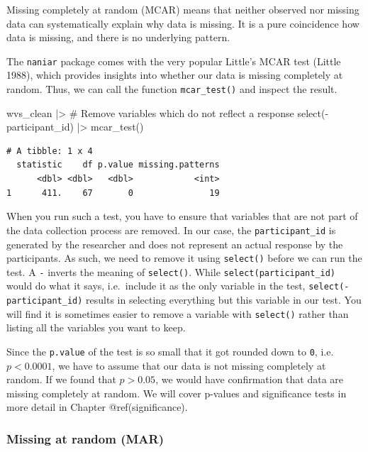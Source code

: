 \documentclass[
  letterpaper,
]{krantz}
\makeatletter
\newenvironment{Shaded}{\begin{snugshade}}{\end{snugshade}}
\newcommand{\CommentTok}[1]{\textcolor[rgb]{0.37,0.37,0.37}{#1}}
\newcommand{\FunctionTok}[1]{\textcolor[rgb]{0.28,0.35,0.67}{#1}}
\newcommand{\NormalTok}[1]{\textcolor[rgb]{0.00,0.23,0.31}{#1}}
\newcommand{\SpecialCharTok}[1]{\textcolor[rgb]{0.37,0.37,0.37}{#1}}
\newenvironment{kframe}{%
\medskip{}
\setlength{\fboxsep}{.8em}
 \def\at@end@of@kframe{}%
 \ifinner\ifhmode%
  \def\at@end@of@kframe{\end{minipage}}%
  \begin{minipage}{\columnwidth}%
 \fi\fi%
 \def\FrameCommand##1{\hskip\@totalleftmargin \hskip-\fboxsep
 \colorbox{shadecolor}{##1}\hskip-\fboxsep
     \hskip-\linewidth \hskip-\@totalleftmargin \hskip\columnwidth}%
 \MakeFramed {\advance\hsize-\width
   \@totalleftmargin\z@ \linewidth\hsize
   \@setminipage}}%
 {\par\unskip\endMakeFramed%
 \at@end@of@kframe}
\renewenvironment{Shaded}{\begin{kframe}}{\end{kframe}}
\makeatother
\begin{document}
Missing completely at random (MCAR) means that neither observed nor
missing data can systematically explain why data is missing. It is a
pure coincidence how data is missing, and there is no underlying
pattern.

The \texttt{naniar} package comes with the very popular Little's MCAR
test (Little 1988), which provides insights into whether our data is
missing completely at random. Thus, we can call the function
\texttt{mcar\_test()} and inspect the result.

\begin{Shaded}
\begin{Highlighting}[]
\NormalTok{wvs\_clean }\SpecialCharTok{|\textgreater{}}
  \CommentTok{\# Remove variables which do not reflect a response}
  \FunctionTok{select}\NormalTok{(}\SpecialCharTok{{-}}\NormalTok{participant\_id) }\SpecialCharTok{|\textgreater{}}
  \FunctionTok{mcar\_test}\NormalTok{()}
\end{Highlighting}
\end{Shaded}

\begin{verbatim}
# A tibble: 1 x 4
  statistic    df p.value missing.patterns
      <dbl> <dbl>   <dbl>            <int>
1      411.    67       0               19
\end{verbatim}

When you run such a test, you have to ensure that variables that are not
part of the data collection process are removed. In our case, the
\texttt{participant\_id} is generated by the researcher and does not
represent an actual response by the participants. As such, we need to
remove it using \texttt{select()} before we can run the test. A
\texttt{-} inverts the meaning of \texttt{select()}. While
\texttt{select(participant\_id)} would do what it says, i.e.~include it
as the only variable in the test, \texttt{select(-participant\_id)}
results in selecting everything but this variable in our test. You will
find it is sometimes easier to remove a variable with \texttt{select()}
rather than listing all the variables you want to keep.

Since the \texttt{p.value} of the test is so small that it got rounded
down to \texttt{0}, i.e.~\(p<0.0001\), we have to assume that our data
is not missing completely at random. If we found that \(p>0.05\), we
would have confirmation that data are missing completely at random. We
will cover p-values and significance tests in more detail in Chapter
@ref(significance).

\subsubsection{Missing at random (MAR)}\label{sec-missing-at-random-mar}
\end{document}
